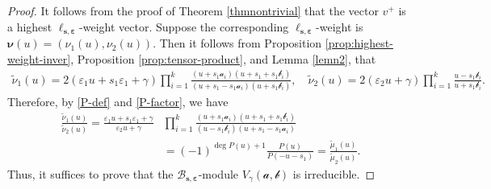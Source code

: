\documentclass[11pt,reqno]{amsart}
\numberwithin{equation}{section}
\theoremstyle{definition}
\theoremstyle{remark}
\newcommand{\mc}{\mathcal}
\newcommand{\tl}{\tilde}
\newcommand{\BMN}{{\mathscr{B}_{\bm s,\bm \ve}}}
\newcommand{\ve}{\varepsilon}
\newcommand{\s}{{\bm s}}
\begin{document}
\begin{proof}
It follows from the proof of Theorem \ref{thmnontrivial} that the vector $v^+$ is a highest $\ell_{\s,\bm\ve}$-weight vector. Suppose the corresponding $\ell_{\s,\bm\ve}$-weight is $\bm\nu(u)=(\nu_1(u),\nu_2(u))$. Then it follows from Proposition \ref{prop:highest-weight-inver}, Proposition \ref{prop:tensor-product}, and Lemma \ref{lemn2}, that
\begin{align*}
\tl \nu_1(u)=2(\ve_1u+s_1\ve_1+\gamma)\prod_{i=1}^k\frac{(u+s_1\mc a_i)(u+s_1+s_1\mc b_i)}{(u+s_1-s_1\mc a_i)(u+s_1\mc b_i)},\quad \tl \nu_2(u) = 2(\ve_2u+\gamma) \prod_{i=1}^k\frac{u-s_1\mc b_i}{u+s_1\mc b_i}.
\end{align*}
Therefore, by \eqref{P-def} and \eqref{P-factor}, we have
\begin{align*}
 \frac{\tl \nu_1(u)}{\tl \nu_2(u)}=\frac{\ve_1u+s_1\ve_1+\gamma}{\ve_2u+\gamma}&\prod_{i=1}^k\frac{(u+s_1\mc a_i)(u+s_1+s_1\mc b_i)}{(u-s_1\mc b_i)(u+s_1-s_1\mc a_i)}\\&=(-1)^{\deg P(u)+1}\frac{P(u)}{P(-u-s_1)}=\frac{\tl \mu_1(u)}{\tl \mu_2(u)}.
\end{align*}
Thus, it suffices to prove that the  $\BMN$-module $V_{\gamma}(\bm{\mc a,\mc b})$ is irreducible.


\end{proof}
\end{document}
